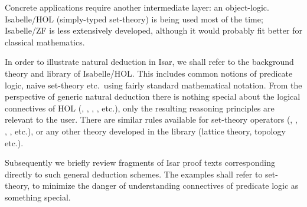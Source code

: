 \begin{isabellebody}
\begin{isamarkuptext}
  Concrete applications require another intermediate layer: an
  object-logic.  Isabelle/HOL \cite{isa-tutorial} (simply-typed
  set-theory) is being used most of the time; Isabelle/ZF
  \cite{isabelle-ZF} is less extensively developed, although it would
  probably fit better for classical mathematics.

  \medskip In order to illustrate natural deduction in Isar, we shall
  refer to the background theory and library of Isabelle/HOL.  This
  includes common notions of predicate logic, naive set-theory etc.\
  using fairly standard mathematical notation.  From the perspective
  of generic natural deduction there is nothing special about the
  logical connectives of HOL (, , ,
  \isa{{\isaliteral{22}{\isachardoublequote}}{\isaliteral{5C3C6578697374733E}{\isasymexists}}{\isaliteral{22}{\isachardoublequote}}}, etc.), only the resulting reasoning principles are
  relevant to the user.  There are similar rules available for
  set-theory operators (, , , , etc.), or any other theory developed in the library (lattice
  theory, topology etc.).

  Subsequently we briefly review fragments of Isar proof texts
  corresponding directly to such general deduction schemes.  The
  examples shall refer to set-theory, to minimize the danger of
  understanding connectives of predicate logic as something special.


\end{isamarkuptext}
\end{isabellebody}
